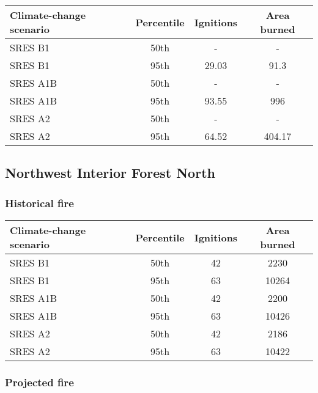 \documentclass{article}\usepackage[]{graphicx}\usepackage[]{color}
\newcommand{\headcol}{\rowcolor{tableheadcolor}}
\begin{document}
\begin{table}[ht]
\centering
\begin{tabular}{lccc}
  \headcol 
 \toprule
Climate-change scenario & Percentile & Ignitions & Area burned \\ 
  \midrule
SRES B1 & 50th & - & - \\ 
  SRES B1 & 95th & 29.03 & 91.3 \\ 
  SRES A1B & 50th & - & - \\ 
  SRES A1B & 95th & 93.55 & 996 \\ 
  SRES A2 & 50th & - & - \\ 
  SRES A2 & 95th & 64.52 & 404.17 \\ 
   \bottomrule
\end{tabular}
\end{table}


\newpage
\subsection{Northwest Interior Forest North}
\subsubsection{Historical fire}

\begin{table}[ht]
\centering
\begin{tabular}{lccc}
  \headcol 
 \toprule
Climate-change scenario & Percentile & Ignitions & Area burned \\ 
  \midrule
SRES B1 & 50th & 42 & 2230 \\ 
  SRES B1 & 95th & 63 & 10264 \\ 
  SRES A1B & 50th & 42 & 2200 \\ 
  SRES A1B & 95th & 63 & 10426 \\ 
  SRES A2 & 50th & 42 & 2186 \\ 
  SRES A2 & 95th & 63 & 10422 \\ 
   \bottomrule
\end{tabular}
\end{table}


\subsubsection{Projected fire}
\end{document}
